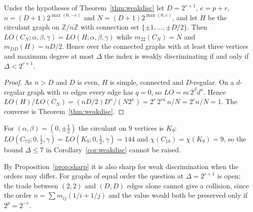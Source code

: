 \begin{proposition}[Sharpness]\label{prop:sharp}
Under the hypotheses of Theorem~\ref{thm:weakdisc} let $D = 2^{r+1}$, $e = p + r$,
$n = (D+1)2^{\max(0,-e)}$ and $N = (D+1)2^{\max(0,e)}$, and let $H$ be the circulant
graph on $\mathbb{Z}/n\mathbb{Z}$ with connection set $\{\pm 1, \dots, \pm D/2\}$. Then
$LO(C_N;\alpha,\beta,\gamma) = LO(H;\alpha,\beta,\gamma)$ while $m_{22}(C_N) = N$ and
$m_{DD}(H) = nD/2$. Hence over the connected graphs with at least three vertices and
maximum degree at most $\Delta$ the index is weakly discriminating if and only if
$\Delta < 2^{r+1}$.
\end{proposition}

\begin{proof}
As $n > D$ and $D$ is even, $H$ is simple, connected and $D$-regular. On a $d$-regular
graph with $m$ edges every edge has $q = 0$, so $LO = m\,2^{\beta} d^{\kappa}$. Hence
$LO(H)/LO(C_N) = (nD/2)D^{\kappa}/(N 2^{\kappa}) = 2^{r}\,2^{r\kappa}\,n/N = 2^{e}n/N = 1$.
The converse is Theorem~\ref{thm:weakdisc}.
\end{proof}

For $(\alpha,\beta) = (0,\pm\tfrac12)$ the circulant on $9$ vertices is $K_9$:
$LO(C_{72};0,\tfrac12,\gamma) = LO(K_9;0,\tfrac12,\gamma) = 144$ and
$\chi(C_{18}) = \chi(K_9) = 9$, so the bound $\Delta \le 7$ in
Corollary~\ref{cor:weakdisc} cannot be raised.

By Proposition~\ref{prop:sharp} it is also sharp for weak discrimination when the
orders may differ. For graphs of equal order the question at $\Delta = 2^{r+1}$ is
open; the trade between $(2,2)$ and $(D,D)$ edges alone cannot give a collision,
since the order $n = \sum m_{ij}(1/i + 1/j)$ and the value would both be preserved
only if $2^{p} = 2^{-r}$.
